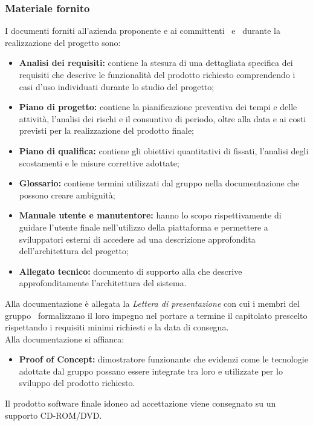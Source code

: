 \subsubsection{Materiale fornito}\label{MaterialeFornito} 
I documenti forniti all'azienda proponente e ai committenti \VT\ e \CR\ durante la realizzazione del progetto sono:
\begin{itemize}
	\item \textbf{Analisi dei requisiti:} contiene la stesura di una dettagliata specifica dei requisiti che descrive le funzionalità del prodotto richiesto comprendendo i casi d'uso individuati durante lo studio del progetto;
	\item \textbf{Piano di progetto:} contiene la pianificazione preventiva dei tempi e delle attività, l’analisi dei rischi e il consuntivo di periodo, oltre alla data e ai costi previsti per la realizzazione del prodotto finale;
	\item \textbf{Piano di qualifica:} contiene gli obiettivi quantitativi di  fissati, l'analisi degli scostamenti e le misure correttive adottate;
	\item \textbf{Glossario:} contiene termini utilizzati dal gruppo nella documentazione che possono creare ambiguità;
	\item \textbf{Manuale utente e manutentore:} hanno lo scopo rispettivamente di guidare l'utente finale nell'utilizzo della piattaforma e permettere a sviluppatori esterni di accedere ad una descrizione approfondita dell'architettura del progetto;
	\item \textbf{Allegato tecnico:} documento di supporto alla  che descrive approfonditamente l'architettura del sistema.
\end{itemize}
Alla documentazione è allegata la \textit{Lettera di presentazione} con cui i membri del gruppo \Gruppo\ formalizzano il loro impegno nel portare a termine il capitolato prescelto rispettando i requisiti minimi richiesti e la data di consegna.\\
Alla documentazione si affianca:
\begin{itemize}
	\item \textbf{Proof of Concept:} dimostratore funzionante che evidenzi come le tecnologie adottate dal gruppo possano essere integrate tra loro e utilizzate per lo sviluppo del prodotto richiesto.
\end{itemize}
Il prodotto software finale idoneo ad accettazione viene consegnato su un supporto CD-ROM/DVD.


